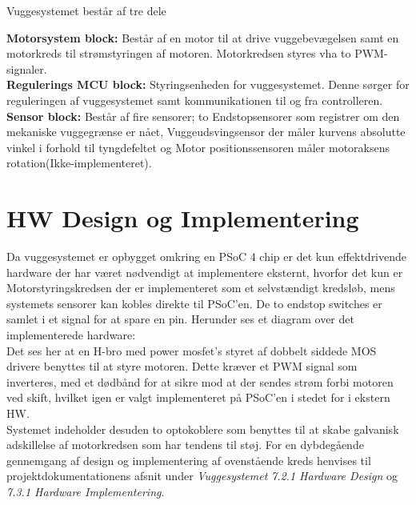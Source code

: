
Vuggesystemet består af tre dele

\textbf{Motorsystem block:} Består af en motor til at drive vuggebevægelsen samt en motorkreds til strømstyringen af motoren. Motorkredsen styres vha to PWM-signaler.\\
\textbf{Regulerings MCU block:} Styringsenheden for vuggesystemet. Denne sørger for reguleringen af vuggesystemet samt kommunikationen til og fra controlleren.\\
\textbf{Sensor block:} Består af fire sensorer; to Endstopsensorer som registrer om den mekaniske vuggegrænse er nået, Vuggeudsvingsensor der måler kurvens absolutte vinkel i forhold til tyngdefeltet og Motor positionssensoren måler motoraksens rotation(Ikke-implementeret).




\section{HW Design og Implementering}
\label{vs_HW}
Da vuggesystemet er opbygget omkring en PSoC 4 chip er det kun effektdrivende hardware der har været nødvendigt at implementere eksternt, hvorfor det kun er Motorstyringskredsen der er implementeret som et selvstændigt kredsløb, mens systemets sensorer kan kobles direkte til PSoC'en. De to endstop switches er samlet i et signal for at spare en pin. Herunder ses et diagram over det implementerede hardware:\\
Det ses her at en H-bro med power mosfet's styret af dobbelt siddede MOS drivere benyttes til at styre motoren. Dette kræver et PWM signal som inverteres, med et dødbånd for at sikre mod at der sendes strøm forbi motoren ved skift, hvilket igen er valgt implementeret på PSoC'en i stedet for i ekstern HW. \\ Systemet indeholder desuden to optokoblere som benyttes til at skabe galvanisk adskillelse af motorkredsen som har tendens til støj.
For en dybdegående gennemgang af design og implementering af ovenstående kreds henvises til projektdokumentationens afsnit under \textit{Vuggesystemet} \textit{7.2.1 Hardware Design} og \textit{7.3.1 Hardware Implementering}.\\



